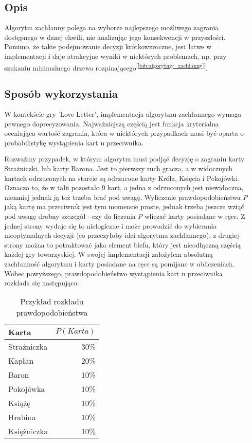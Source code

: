 \subsection{Opis}
Algorytm zachłanny polega na wyborze najlepszego możliwego zagrania dostępnego w danej chwili, nie analizując jego konsekwencji w przyszłości. Pomimo, że takie podejmowanie decyzji krótkowzroczne, jest łatwe w implementacji i daje atrakcyjne wyniki w niektórych problemach, np. przy szukaniu minimalnego drzewa rozpinającego\textsuperscript{[\ref{bib:algorytmy_zachlanny}]}.

\subsection{Sposób wykorzystania}

W kontekście gry 'Love Letter', implementacja algorytmu zachłannego wymaga pewnego doprecyzowania. Najważniejszą częścią jest funkcja kryterialna oceniająca wartość zagrania, która w niektórych przypadkach musi być oparta o probabilistykę wystąpienia kart u przeciwnika. 

Rozważmy przypadek, w którym algorytm musi podjąć decyzję o zagraniu karty Strażniczki, lub karty Barona. Jest to pierwszy ruch gracza, a w widocznych kartach odrzuconych na starcie są odrzucone karty Króla, Księcia i Pokojówki. Oznacza to, że w talii pozostało 9 kart, a jedna z odrzuconych jest niewidoczna, niemniej jednak ją też trzeba brać pod uwagę. Wyliczenie prawdopodobieństwa \textit{P} jaką kartę ma przeciwnik jest tym momencie proste, jednak trzeba jeszcze wziąć pod uwagę drobny szczegół - czy do liczenia \textit{P} wliczać karty posiadane w ręce. Z jednej strony wydaje się to nielogiczne i może prowadzić do wybierania nieoptymalnych decyzji (co przeczyłoby idei algorytmu zachłannego), z drugiej strony można to potraktować jako element blefu, który jest nieodłączną częścią każdej gry towarzyskiej. W swojej implementacji założyłem absolutną zachłanność algorytmu i karty posiadane na ręce są pomijane w obliczeniach. 
Wobec powyższego, prawdopodobieństwo wystąpienia kart u przeciwnika rozkłada się następująco:

\begin{table}[h]
	\caption{Przykład rozkładu prawdopodobieństwa}
	\centering
		\begin{tabular}{|l|r|}
			\hline
			\bf{Karta} & $P(Karta)$	\\ \hline
			Strażniczka & 30\% 			\\ \hline
			Kapłan & 20\% 				\\ \hline
			Baron & 10\% 				\\ \hline
			Pokojówka & 10\% 			\\ \hline
			Książę & 10\% 				\\ \hline
			Hrabina & 10\% 				\\ \hline
			Księżniczka & 10\% 			\\ \hline
		\end{tabular}
\end{table}

